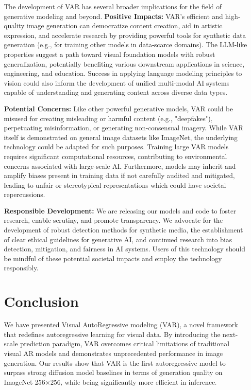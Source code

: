 \documentclass{article}
\begin{document}
The development of VAR has several broader implications for the field of generative modeling and beyond.
\textbf{Positive Impacts:} VAR's efficient and high-quality image generation can democratize content creation, aid in artistic expression, and accelerate research by providing powerful tools for synthetic data generation (e.g., for training other models in data-scarce domains). The LLM-like properties suggest a path toward visual foundation models with robust generalization, potentially benefiting various downstream applications in science, engineering, and education. Success in applying language modeling principles to vision could also inform the development of unified multi-modal AI systems capable of understanding and generating content across diverse data types.

\textbf{Potential Concerns:} Like other powerful generative models, VAR could be misused for creating misleading or harmful content (e.g., "deepfakes"), perpetuating misinformation, or generating non-consensual imagery. While VAR itself is demonstrated on general image datasets like ImageNet, the underlying technology could be adapted for such purposes. Training large VAR models requires significant computational resources, contributing to environmental concerns associated with large-scale AI. Furthermore, models may inherit and amplify biases present in training data if not carefully audited and mitigated, leading to unfair or stereotypical representations which could have societal repercussions.

\textbf{Responsible Development:} We are releasing our models and code to foster research, enable scrutiny, and promote transparency. We advocate for the development of robust detection methods for synthetic media, the establishment of clear ethical guidelines for generative AI, and continued research into bias detection, mitigation, and fairness in AI systems. Users of this technology should be mindful of these potential societal impacts and employ the technology responsibly.

\section{Conclusion}
\label{sec:conclusion}

We have presented Visual AutoRegressive modeling (VAR), a novel framework that redefines autoregressive learning for visual data. By introducing the next-scale prediction paradigm, VAR overcomes critical limitations of traditional visual AR models and demonstrates unprecedented performance in image generation. Our results show that VAR is the first autoregressive model to surpass strong diffusion model baselines in terms of generation quality on ImageNet 256$\times$256, while being significantly more efficient in inference.
\end{document}
